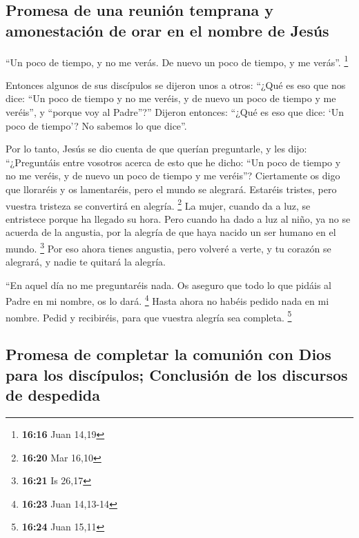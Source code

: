 \begin{paracol}{2}
\hypertarget{promesa-de-una-reuniuxf3n-temprana-y-amonestaciuxf3n-de-orar-en-el-nombre-de-jesuxfas}{%
\subsection{Promesa de una reunión temprana y amonestación de orar en el
nombre de
Jesús}\label{promesa-de-una-reuniuxf3n-temprana-y-amonestaciuxf3n-de-orar-en-el-nombre-de-jesuxfas}}

 ``Un poco de tiempo, y no me verás. De nuevo un poco de
tiempo, y me verás''. \footnote{\textbf{16:16} Juan 14,19}

 Entonces algunos de sus discípulos se dijeron unos a
otros: ``¿Qué es eso que nos dice: ``Un poco de tiempo y no me veréis, y
de nuevo un poco de tiempo y me veréis'', y ``porque voy al Padre''?''
 Dijeron entonces: ``¿Qué es eso que dice: `Un poco de
tiempo'? No sabemos lo que dice''.

 Por lo tanto, Jesús se dio cuenta de que querían
preguntarle, y les dijo: ``¿Preguntáis entre vosotros acerca de esto que
he dicho: ``Un poco de tiempo y no me veréis, y de nuevo un poco de
tiempo y me veréis''?  Ciertamente os digo que lloraréis
y os lamentaréis, pero el mundo se alegrará. Estaréis tristes, pero
vuestra tristeza se convertirá en alegría. \footnote{\textbf{16:20} Mar
  16,10}  La mujer, cuando da a luz, se entristece porque
ha llegado su hora. Pero cuando ha dado a luz al niño, ya no se acuerda
de la angustia, por la alegría de que haya nacido un ser humano en el
mundo. \footnote{\textbf{16:21} Is 26,17}  Por eso ahora
tienes angustia, pero volveré a verte, y tu corazón se alegrará, y nadie
te quitará la alegría.

 ``En aquel día no me preguntaréis nada. Os aseguro que
todo lo que pidáis al Padre en mi nombre, os lo dará. \footnote{\textbf{16:23}
  Juan 14,13-14}  Hasta ahora no habéis pedido nada en mi
nombre. Pedid y recibiréis, para que vuestra alegría sea completa.
\footnote{\textbf{16:24} Juan 15,11}

\hypertarget{promesa-de-completar-la-comuniuxf3n-con-dios-para-los-discuxedpulos-conclusiuxf3n-de-los-discursos-de-despedida}{%
\subsection{Promesa de completar la comunión con Dios para los
discípulos; Conclusión de los discursos de
despedida}\label{promesa-de-completar-la-comuniuxf3n-con-dios-para-los-discuxedpulos-conclusiuxf3n-de-los-discursos-de-despedida}}


\end{paracol}
